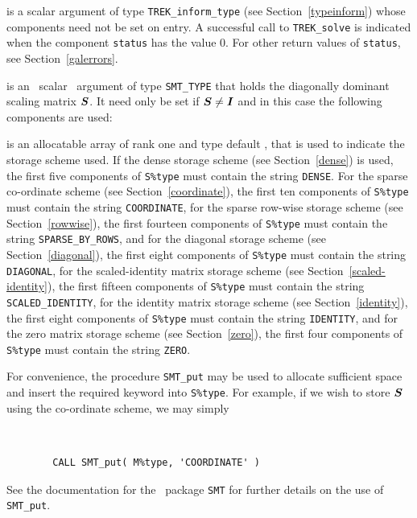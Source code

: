 \documentclass{galahad}
\newcommand{\packagename}{TREK}
\begin{document}
\begin{description}
 is a scalar \intentinout argument of type
{\tt \packagename\_inform\_type}
(see Section~\ref{typeinform})
whose components need not be set on entry.
A successful call to
{\tt \packagename\_solve}
is indicated when the  component {\tt status} has the value 0.
For other return values of {\tt status}, see Section~\ref{galerrors}.

 is an \optional\ scalar \intentin\ argument of type {\tt SMT\_TYPE}
that holds the diagonally dominant scaling matrix ${\bm{S}}$. It need only be set
if ${\bm{S}} \neq {\bm{I}}$ and in this case the following components are used:

\begin{description}

 is an allocatable array of rank one and type default
\character, that
is used to indicate the storage scheme used. If the dense storage scheme
(see Section~\ref{dense}) is used,
the first five components of {\tt S\%type} must contain the
string {\tt DENSE}.
For the sparse co-ordinate scheme (see Section~\ref{coordinate}),
the first ten components of {\tt S\%type} must contain the
string {\tt COORDINATE},
for the sparse row-wise storage scheme (see Section~\ref{rowwise}),
the first fourteen components of {\tt S\%type} must contain the
string {\tt SPARSE\_BY\_ROWS},
and for the diagonal storage scheme (see Section~\ref{diagonal}),
the first eight components of {\tt S\%type} must contain the
string {\tt DIAGONAL},
for the scaled-identity matrix storage scheme
(see Section~\ref{scaled-identity}),
the first fifteen components of {\tt S\%type} must contain the
string {\tt SCALED\_IDENTITY},
for the identity matrix storage scheme
(see Section~\ref{identity}),
the first eight components of {\tt S\%type} must contain the
string {\tt IDENTITY}, and
for the zero matrix storage scheme
(see Section~\ref{zero}),
the first four components of {\tt S\%type} must contain the
string {\tt ZERO}.

For convenience, the procedure {\tt SMT\_put}
may be used to allocate sufficient space and insert the required keyword
into {\tt S\%type}.
For example, if we wish to store ${\bm{S}}$ using the co-ordinate scheme,
we may simply
{\tt
\begin{verbatim}
        CALL SMT_put( M%type, 'COORDINATE' )
\end{verbatim}
}
\noindent
See the documentation for the \galahad\ package {\tt SMT}
for further details on the use of {\tt SMT\_put}.


\end{description}
\end{description}
\end{document}
